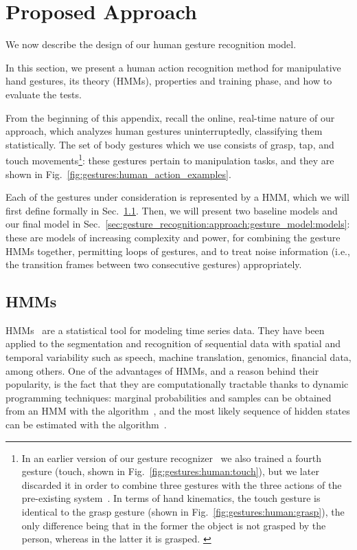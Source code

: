 \section{Proposed Approach}
\label{sec:gesture_recognition:approach}

We now describe the design of our human gesture recognition model.

In this section, we present a human action recognition method for manipulative hand gestures, its theory (\aclp{HMM}), properties and training phase, and how to evaluate the tests.

From the beginning of this appendix, recall the online, real-time nature of our approach, which analyzes human gestures uninterruptedly, classifying them statistically.
The set of body gestures which we use consists of grasp, tap, and touch movements\footnote{%
In an earlier version of our gesture recognizer~\cite{saponaro:2013:crhri} we also trained a fourth gesture (touch, shown in Fig.~\ref{fig:gestures:human:touch}), but we later discarded it in order to combine three gestures with the three actions of the pre-existing \AffWords{} system~\cite{salvi:2012:smcb}. In terms of hand kinematics, the touch gesture is identical to the grasp gesture (shown in Fig.~\ref{fig:gestures:human:grasp}), the only difference being that in the former the object is not grasped by the person, whereas in the latter it is grasped. \label{footnote:touch_gesture} %
}: these gestures pertain to manipulation tasks, and they are shown in Fig.~\ref{fig:gestures:human_action_examples}.

Each of the gestures under consideration is represented by a \ac{HMM}, which we will first define formally in Sec.~\ref{sec:hmm}.
Then, we will present two baseline models and our final model in Sec.~\ref{sec:gesture_recognition:approach:gesture_model:models}: these are models of increasing complexity and power, for combining the gesture \acp{HMM} together, permitting loops of gestures, and to treat noise information (i.e., the transition frames between two consecutive gestures) appropriately.

\subsection{\aclp{HMM}}
\label{sec:hmm}

\acp{HMM}~\cite{rabiner:1989:hmm} are a statistical tool for modeling time series data. They have been applied to the segmentation and recognition of sequential data with spatial and temporal variability such as speech, machine translation, genomics, financial data, among others.
One of the advantages of \acp{HMM}, and a reason behind their popularity, is the fact that they are computationally tractable thanks to dynamic programming techniques: marginal probabilities and samples can be obtained from an \ac{HMM} with the \FB{} algorithm~\cite[Sec.~III.A]{rabiner:1989:hmm}, and the most likely sequence of hidden states can be estimated with the \Viterbi{} algorithm~\cite[Sec.~III.B]{rabiner:1989:hmm}.

